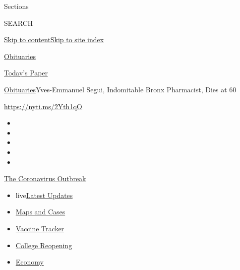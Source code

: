 Sections

SEARCH

\protect\hyperlink{site-content}{Skip to
content}\protect\hyperlink{site-index}{Skip to site index}

\href{https://www.nytimes3xbfgragh.onion/section/obituaries}{Obituaries}

\href{https://myaccount.nytimes3xbfgragh.onion/auth/login?response_type=cookie\&client_id=vi}{}

\href{https://www.nytimes3xbfgragh.onion/section/todayspaper}{Today's
Paper}

\href{/section/obituaries}{Obituaries}\textbar{}Yves-Emmanuel Segui,
Indomitable Bronx Pharmacist, Dies at 60

\url{https://nyti.ms/2Yth1qO}

\begin{itemize}
\item
\item
\item
\item
\item
\end{itemize}

\href{https://www.nytimes3xbfgragh.onion/news-event/coronavirus?action=click\&pgtype=Article\&state=default\&region=TOP_BANNER\&context=storylines_menu}{The
Coronavirus Outbreak}

\begin{itemize}
\tightlist
\item
  live\href{https://www.nytimes3xbfgragh.onion/2020/08/04/world/coronavirus-covid-19.html?action=click\&pgtype=Article\&state=default\&region=TOP_BANNER\&context=storylines_menu}{Latest
  Updates}
\item
  \href{https://www.nytimes3xbfgragh.onion/interactive/2020/us/coronavirus-us-cases.html?action=click\&pgtype=Article\&state=default\&region=TOP_BANNER\&context=storylines_menu}{Maps
  and Cases}
\item
  \href{https://www.nytimes3xbfgragh.onion/interactive/2020/science/coronavirus-vaccine-tracker.html?action=click\&pgtype=Article\&state=default\&region=TOP_BANNER\&context=storylines_menu}{Vaccine
  Tracker}
\item
  \href{https://www.nytimes3xbfgragh.onion/2020/08/02/us/covid-college-reopening.html?action=click\&pgtype=Article\&state=default\&region=TOP_BANNER\&context=storylines_menu}{College
  Reopening}
\item
  \href{https://www.nytimes3xbfgragh.onion/live/2020/08/03/business/stock-market-today-coronavirus?action=click\&pgtype=Article\&state=default\&region=TOP_BANNER\&context=storylines_menu}{Economy}
\end{itemize}


